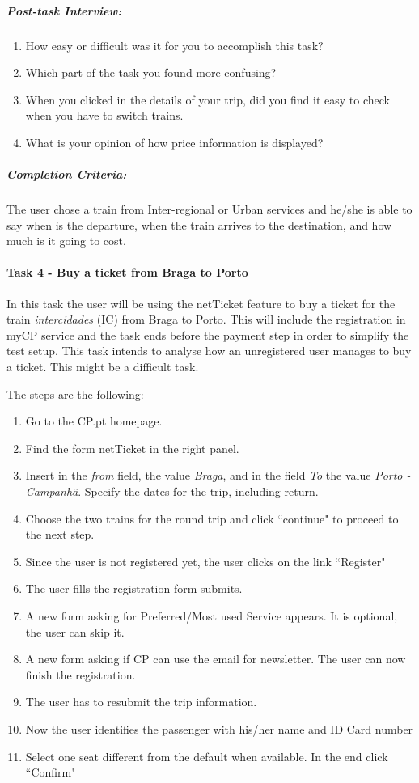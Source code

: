 \documentclass[a4paper]{article}
\begin{document}
\subparagraph{Post-task Interview:}

\begin{enumerate}[label=3.\theenumi .]
  \item How easy or difficult was it for you to accomplish this task?
  \item Which part of the task you found more confusing?
  \item When you clicked in the details of your trip, did you find it easy to check when you have to switch trains.
  \item What is your opinion of how price information is displayed?
\end{enumerate}

\subparagraph{Completion Criteria:} The user chose a train from Inter-regional or Urban services and he/she is able to say when is the departure, when the train arrives to the destination, and how much is it going to cost.


\paragraph{Task 4 - Buy a ticket from Braga to Porto}
In this task the user will be using the netTicket feature to buy a ticket for the train \emph{intercidades} (IC) from Braga to Porto. This will include the registration in myCP service and the task ends before the payment step in order to simplify the test setup. This task intends to analyse how an unregistered user manages to buy a ticket. This might be a difficult task.

The steps are the following:

\begin{enumerate}[label=\roman*.]
  \item Go to the CP.pt homepage.
  \item Find the form netTicket in the right panel.
  \item Insert in the \emph{from} field, the value \emph{Braga}, and in the field \emph{To} the value \emph{Porto - Campanhã}. Specify the dates for the trip, including return.
  \item Choose the two trains for the round trip and click ``continue" to proceed to the next step.
  \item Since the user is not registered yet, the user clicks on the link ``Register"
  \item The user fills the registration form submits.
  \item A new form asking for Preferred/Most used Service appears. It is optional, the user can skip it.
  \item A new form asking if CP can use the email for newsletter. The user can now finish the registration.
  \item The user has to resubmit the trip information.
  \item Now the user identifies the passenger with his/her name and ID Card number
  \item Select one seat different from the default when available. In the end click ``Confirm"
\end{enumerate}
\end{document}
